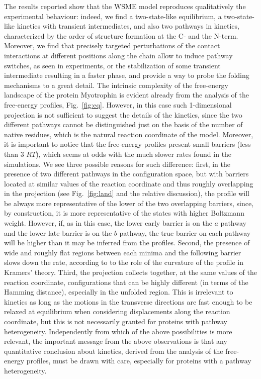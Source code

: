 The results reported show that the WSME model reproduces qualitatively the
experimental behaviour: indeed, we find a two-state-like equilibrium, a
two-state-like kinetics with transient intermediates, and also two pathways in
kinetics, characterized by the order of structure formation at the C- and the
N-term. Moreover, we find that precisely targeted perturbations of the contact
interactions at  different positions along the chain allow to induce pathway
switches, as seen in experiments, or the stabilization of some transient
intermediate resulting in a faster phase, and provide a way to probe the folding
mechanisms to a great detail. 
The intrinsic complexity of the free-energy landscape of the protein Myotrophin
is evident already from the analysis of the free-energy profiles,
Fig.~\ref{fig:eq}. However, in this case such 1-dimensional projection is not
sufficient to suggest the details of the kinetics, since the two different
pathways cannot be distinguished just on the basis of the number of native
residues, which  is the natural reaction coordinate of the model.
Moreover, it is important to notice that the free-energy profiles present
small barriers (less than 3 $RT$), which seems at odds with the much slower
rates found in the simulations. We see three possible reasons for such
difference: first, in the presence of two different pathways in the
configuration space, but with barriers located at similar values of the reaction
coordinate and thus roughly overlapping in the projection (see
Fig.~\ref{fig:land} and the relative discussion), the profile will be  always
more representative of the lower of the two overlapping barriers, since, by
construction, it is more representative of the states with higher Boltzmann
weight. However, if, as in this case, the lower early barrier is on the $a$
pathway and the lower late barrier is on the  $b$ pathway, the true barrier on
each pathway will be higher than it may be inferred from the profiles. Second,
the presence of wide and roughly flat regions between each minima and the
following barrier slows down the rate, according to  to the role of the
curvature of the profile in Kramers' theory. Third, the projection collects
together, at the same values of the reaction coordinate, configurations that can
be highly different (in terms of the Hamming distance), especially in the
unfolded region. This is irrelevant to kinetics as long as the motions in the
transverse directions are fast enough to be relaxed at equilibrium when
considering displacements along the reaction coordinate, but this is not
necessarily granted for proteins with pathway heterogeneity. Independently from
which of the above possibilities is more relevant, the important message from
the above observations is that any quantitative conclusion about kinetics,
derived from the analysis of the free-energy profiles, must be drawn with care,
especially for proteins with a pathway heterogeneity.

